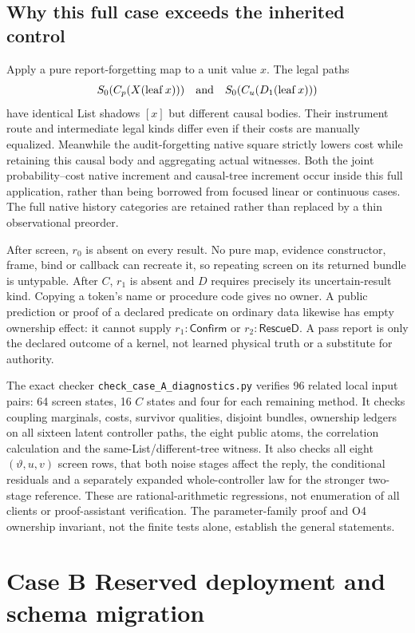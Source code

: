 \documentclass[11pt,a4paper]{article}
\theoremstyle{definition}
\newcommand{\leaf}{\operatorname{leaf}}
\begin{document}
\subsection{Why this full case exceeds the inherited control}
Apply a pure report-forgetting map to a unit value $x$. The legal paths
\[
S_0(C_p(X(\leaf x)))\quad\hbox{and}\quad
S_0(C_u(D_1(\leaf x)))
\]
have identical List shadows $[x]$ but different causal bodies. Their
instrument route and intermediate legal kinds differ even if their costs
are manually equalized. Meanwhile the audit-forgetting native square
strictly lowers cost while retaining this causal body and aggregating
actual witnesses. Both the joint probability--cost native increment and
causal-tree increment occur inside this full application, rather than
being borrowed from focused linear or continuous cases. The full native
history categories are retained rather than replaced by a thin
observational preorder.

After screen, $r_0$ is absent on every result. No pure map, evidence
constructor, frame, bind or callback can recreate it, so repeating screen
on its returned bundle is untypable. After $C$, $r_1$ is absent and $D$
requires precisely its uncertain-result kind. Copying a token's name or
procedure code gives no owner. A public prediction or proof of a declared
predicate on ordinary data likewise has empty ownership effect: it
cannot supply $r_1:\mathsf{Confirm}$ or $r_2:\mathsf{RescueD}$. A pass
report is only the declared outcome of a kernel, not learned physical
truth or a substitute for authority.

The exact checker \texttt{check\_case\_A\_diagnostics.py} verifies 96
related local input pairs: 64 screen states, 16 $C$ states and four for
each remaining method. It checks coupling marginals, costs, survivor
qualities, disjoint bundles, ownership ledgers on all sixteen latent
controller paths, the eight public atoms, the correlation calculation
and the same-List/different-tree witness. It also checks all eight
$(\vartheta,u,v)$ screen rows, that both noise stages affect the reply,
the conditional residuals and a separately expanded whole-controller law
for the stronger two-stage reference. These are rational-arithmetic
regressions, not enumeration of all clients or proof-assistant
verification. The parameter-family proof and O4 ownership invariant,
not the finite tests alone, establish the general statements.


\section{Case B Reserved deployment and schema migration}\label{sec:caseB}
\end{document}
